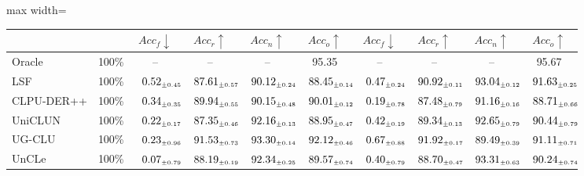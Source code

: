\begin{table}[!htbp]
\begin{adjustbox}{max width=\textwidth}
\begin{tabular}{l|c|cccc|cccc}
& & $Acc_f \downarrow$ & $Acc_r \uparrow$ & $Acc_n \uparrow$ & $Acc_o \uparrow$
& $Acc_f \downarrow$ & $Acc_r \uparrow$ & $Acc_n \uparrow$ & $Acc_o \uparrow$ \\
\midrule
Oracle        & 100\% & -- & -- & -- & 95.35 & -- & -- & -- & 95.67 \\
\midrule
LSF & 100\% & $\kern6pt0.52_{\scriptscriptstyle \pm 0.45}\kern-6pt$ & $\kern6pt87.61_{\scriptscriptstyle \pm 0.57}\kern-6pt$ & $\kern6pt90.12_{\scriptscriptstyle \pm 0.24}\kern-6pt$ & $\kern6pt88.45_{\scriptscriptstyle \pm 0.14}\kern-6pt$ & $\kern6pt0.47_{\scriptscriptstyle \pm 0.24}\kern-6pt$ & \colorbox{yellow!35}{$\kern6pt90.92_{\scriptscriptstyle \pm 0.11}\kern-6pt$} & \colorbox{yellow!35}{$\kern6pt93.04_{\scriptscriptstyle \pm 0.12}\kern-6pt$} & \colorbox{green!25}{$\kern6pt91.63_{\scriptscriptstyle \pm 0.25}\kern-6pt$} \\
CLPU-DER++ & 100\% & $\kern6pt0.34_{\scriptscriptstyle \pm 0.35}\kern-6pt$ & \colorbox{yellow!35}{$\kern6pt89.94_{\scriptscriptstyle \pm 0.55}\kern-6pt$} & $\kern6pt90.15_{\scriptscriptstyle \pm 0.48}\kern-6pt$ & $\kern6pt90.01_{\scriptscriptstyle \pm 0.12}\kern-6pt$ & $\kern6pt0.19_{\scriptscriptstyle \pm 0.78}\kern-6pt$ & $\kern6pt87.48_{\scriptscriptstyle \pm 0.79}\kern-6pt$ & $\kern6pt91.16_{\scriptscriptstyle \pm 0.16}\kern-6pt$ & $\kern6pt88.71_{\scriptscriptstyle \pm 0.66}\kern-6pt$ \\
UniCLUN & 100\% & $\kern6pt0.22_{\scriptscriptstyle \pm 0.17}\kern-6pt$ & $\kern6pt87.35_{\scriptscriptstyle \pm 0.46}\kern-6pt$ & $\kern6pt92.16_{\scriptscriptstyle \pm 0.13}\kern-6pt$ & $\kern6pt88.95_{\scriptscriptstyle \pm 0.47}\kern-6pt$ & $\kern6pt0.42_{\scriptscriptstyle \pm 0.19}\kern-6pt$ & $\kern6pt89.34_{\scriptscriptstyle \pm 0.13}\kern-6pt$ & $\kern6pt92.65_{\scriptscriptstyle \pm 0.79}\kern-6pt$ & $\kern6pt90.44_{\scriptscriptstyle \pm 0.79}\kern-6pt$ \\
UG-CLU & 100\% & $\kern6pt0.23_{\scriptscriptstyle \pm 0.96}\kern-6pt$ & \colorbox{green!25}{$\kern6pt91.53_{\scriptscriptstyle \pm 0.73}\kern-6pt$} & \colorbox{yellow!35}{$\kern6pt93.30_{\scriptscriptstyle \pm 0.14}\kern-6pt$} & \colorbox{green!25}{$\kern6pt92.12_{\scriptscriptstyle \pm 0.46}\kern-6pt$} & $\kern6pt0.67_{\scriptscriptstyle \pm 0.88}\kern-6pt$ & \colorbox{green!25}{$\kern6pt91.92_{\scriptscriptstyle \pm 0.17}\kern-6pt$} & $\kern6pt89.49_{\scriptscriptstyle \pm 0.39}\kern-6pt$ & \colorbox{yellow!35}{$\kern6pt91.11_{\scriptscriptstyle \pm 0.71}\kern-6pt$} \\
UnCLe & 100\% & $\kern6pt0.07_{\scriptscriptstyle \pm 0.79}\kern-6pt$ & $\kern6pt88.19_{\scriptscriptstyle \pm 0.19}\kern-6pt$ & $\kern6pt92.34_{\scriptscriptstyle \pm 0.25}\kern-6pt$ & $\kern6pt89.57_{\scriptscriptstyle \pm 0.74}\kern-6pt$ & $\kern6pt0.40_{\scriptscriptstyle \pm 0.79}\kern-6pt$ & $\kern6pt88.70_{\scriptscriptstyle \pm 0.47}\kern-6pt$ & \colorbox{green!25}{$\kern6pt93.31_{\scriptscriptstyle \pm 0.63}\kern-6pt$} & $\kern6pt90.24_{\scriptscriptstyle \pm 0.74}\kern-6pt$ \\

\end{tabular}
\end{adjustbox}
\end{table}
